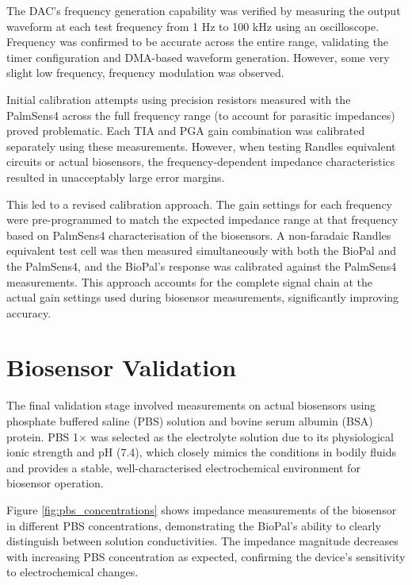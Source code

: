 The DAC's frequency generation capability was verified by measuring the output waveform at each test frequency from 1 Hz to 100 kHz using an oscilloscope. Frequency was confirmed to be accurate across the entire range, validating the timer configuration and DMA-based waveform generation. However, some very slight low frequency, frequency modulation was observed.

Initial calibration attempts using precision resistors measured with the PalmSens4 across the full frequency range (to account for parasitic impedances) proved problematic. Each TIA and PGA gain combination was calibrated separately using these measurements. However, when testing Randles equivalent circuits or actual biosensors, the frequency-dependent impedance characteristics resulted in unacceptably large error margins. 

This led to a revised calibration approach. The gain settings for each frequency were pre-programmed to match the expected impedance range at that frequency based on PalmSens4 characterisation of the biosensors. A non-faradaic Randles equivalent test cell was then measured simultaneously with both the BioPal and the PalmSens4, and the BioPal's response was calibrated against the PalmSens4 measurements. This approach accounts for the complete signal chain at the actual gain settings used during biosensor measurements, significantly improving accuracy.

\section{Biosensor Validation}

The final validation stage involved measurements on actual biosensors using phosphate buffered saline (PBS) solution and bovine serum albumin (BSA) protein. PBS 1× was selected as the electrolyte solution due to its physiological ionic strength and pH (7.4), which closely mimics the conditions in bodily fluids and provides a stable, well-characterised electrochemical environment for biosensor operation.

Figure \ref{fig:pbs_concentrations} shows impedance measurements of the biosensor in different PBS concentrations, demonstrating the BioPal's ability to clearly distinguish between solution conductivities. The impedance magnitude decreases with increasing PBS concentration as expected, confirming the device's sensitivity to electrochemical changes.

